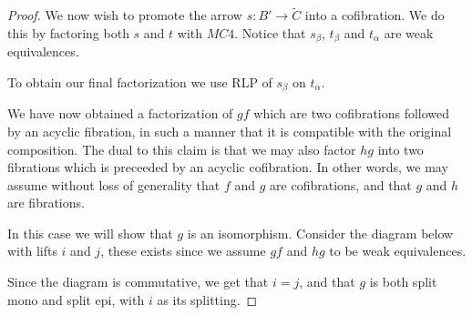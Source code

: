 \documentclass[../thesis.tex]{subfiles}
\begin{document}
\begin{proof}
                We now wish to promote the arrow $s:B'\rightarrow \widetilde{C}$ into a cofibration. We do this by factoring both $s$ and $t$ with $MC4$. Notice that $s_\beta$, $t_\beta$ and $t_\alpha$ are weak equivalences.
                \begin{center}
                \end{center}

                To obtain our final factorization we use RLP of $s_\beta$ on $t_\alpha$.
                \begin{center}
                \end{center}

                We have now obtained a factorization of $gf$ which are two cofibrations followed by an acyclic fibration, in such a manner that it is compatible with the original composition. The dual to this claim is that we may also factor $hg$ into two fibrations which is preceeded by an acyclic cofibration. In other words, we may assume without loss of generality that $f$ and $g$ are cofibrations, and that $g$ and $h$ are fibrations.
                
                In this case we will show that $g$ is an isomorphism. Consider the diagram below with lifts $i$ and $j$, these exists since we assume $gf$ and $hg$ to be weak equivalences.
                \begin{center}
                \end{center}
                Since the diagram is commutative, we get that $i = j$, and that $g$ is both split mono and split epi, with $i$ as its splitting.
            \end{proof}
\end{document}
